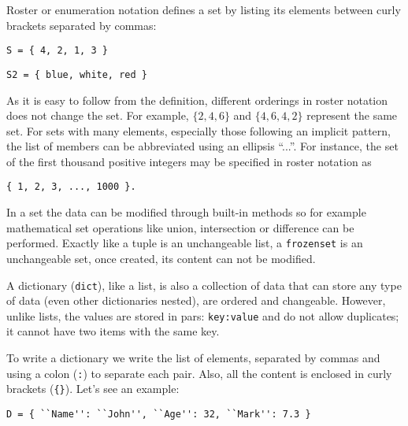 Roster or enumeration notation defines a set by listing its elements between curly brackets separated by commas:
\begin{verbatim}
S = { 4, 2, 1, 3 }
\end{verbatim}
\begin{verbatim}
S2 = { blue, white, red }
\end{verbatim}
As it is easy to follow from the definition, different orderings in roster notation does not change the set.
For example, $\{ 2, 4, 6 \}$ and $\{ 4, 6, 4, 2 \}$ represent the same set.
For sets with many elements, especially those following an implicit pattern,
the list of members can be abbreviated using an ellipsis ``...''.
For instance, the set of the first thousand positive integers 
may be specified in roster notation as
\begin{verbatim}
{ 1, 2, 3, ..., 1000 }.
\end{verbatim}
In a set the data can be modified through built-in methods so for example mathematical set operations like union, intersection or difference can be performed.
Exactly like a tuple is an unchangeable list, a \texttt{frozenset} is an unchangeable set, once created, its content can not be modified. 

A dictionary (\texttt{dict}), like a list, is also a collection of data that can store any type of data (even other dictionaries nested), are ordered and changeable.
However, unlike lists, the values are stored in pars: \texttt{key:value} and do not allow duplicates; it cannot have two items with the same key.

To write a dictionary we write the list of elements, separated by commas and using a colon (\texttt{:}) to separate each pair. 
Also, all the content is enclosed in curly brackets (\texttt{\{\}}). 
Let's see an example:
\begin{verbatim}
D = { ``Name'': ``John'', ``Age'': 32, ``Mark'': 7.3 }
\end{verbatim}

